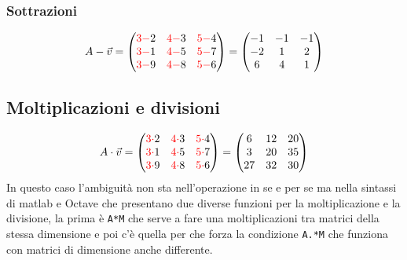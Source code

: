 \documentclass{book}
\begin{document}
\subsubsection{Sottrazioni}
\label{sec:sottvectmtx}
\begin{eqnarray*}
   A-\vec{v} =
  \begin{pmatrix}
    {\color{red}3-}2 & {\color{red}4-}3 & {\color{red}5-}4\\
    {\color{red}3-}1 & {\color{red}4-}5 & {\color{red}5-}7\\
    {\color{red}3-}9 & {\color{red}4-}8 & {\color{red}5-}6        
  \end{pmatrix}=
  \begin{pmatrix}
    -1 & -1 & -1\\
    -2 & 1 & 2 \\
    6 & 4 & 1
  \end{pmatrix}
\end{eqnarray*}

\subsection{Moltiplicazioni e divisioni}
\label{sec:moltedivvetmtx}
\begin{eqnarray*}
   A\cdot\vec{v} =
  \begin{pmatrix}
    {\color{red}3\cdot}2 & {\color{red}4\cdot}3 & {\color{red}5\cdot}4\\
    {\color{red}3\cdot}1 & {\color{red}4\cdot}5 & {\color{red}5\cdot}7\\
    {\color{red}3\cdot}9 & {\color{red}4\cdot}8 & {\color{red}5\cdot}6        
  \end{pmatrix}=
  \begin{pmatrix}
    6 & 12 & 20\\
    3 & 20 & 35\\
    27 & 32 & 30
  \end{pmatrix}
\end{eqnarray*}
In questo caso l'ambiguità non sta
nell'operazione in se e per se ma nella sintassi di matlab e Octave che presentano due diverse funzioni per la moltiplicazione e la divisione, la prima è \lstinline|A*M| che serve a fare una moltiplicazioni tra matrici della stessa dimensione e poi c'è quella per che forza la
condizione \lstinline|A.*M| che funziona con
matrici di dimensione anche differente.
\end{document}
